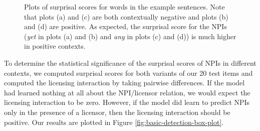 \documentclass[11pt, round]{article}
\begin{document}
\begin{figure}
    \centering
    \qquad
    \caption{Plots of surprisal scores for words in the example sentences. Note that plots (a) and (c) are both contextually negative and plots (b) and (d) are positive. As expected, the surprisal score for the NPIs (\textit{yet} in plots (a) and (b) and \textit{any} in plots (c) and (d)) is much higher in positive contexts.}
    \label{fig:surprisal-basic-licensing}
\end{figure}

To determine the statistical significance of the surprisal scores of NPIs in different contexts, we computed surprisal scores for both variants of our 20 test items and computed the licensing interaction by taking pairwise differences. If the model had learned nothing at all about the NPI/licensor relation, we would expect the licensing interaction to be zero. However, if the model did learn to predict NPIs only in the presence of a licensor, then the licensing interaction should be positive. Our results are plotted in Figure \ref{fig:basic-detection-box-plot}.
\end{document}
